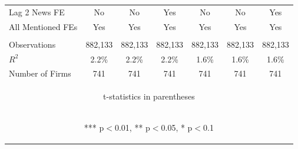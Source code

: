 \documentclass[border=0.2cm]{standalone}
\begin{document}
\begin{tabular}{lcccccc}
    Lag 2 News FE     & No                                             & No                                             & Yes                                            & No                                             & No                                             & Yes                                            \\
    All Mentioned FEs & Yes                                            & Yes                                            & Yes                                            & Yes                                            & Yes                                            & Yes                                            \\
    \vspace{4pt}      &                                                &                                                &                                                &                                                &                                                &                                                \\
    Observations      & 882,133                                        & 882,133                                        & 882,133                                        & 882,133                                        & 882,133                                        & 882,133                                        \\
    \(R^2\)           & 2.2\%                                          & 2.2\%                                          & 2.2\%                                          & 1.6\%                                          & 1.6\%                                          & 1.6\%                                          \\
    Number of Firms   & 741                                            & 741                                            & 741                                            & 741                                            & 741                                            & 741                                            \\
    \bottomrule
    \multicolumn{7}{c}{\begin{footnotesize} t-statistics in parentheses\end{footnotesize}}                                                                                                                                                                                                                                  \\
    \multicolumn{7}{c}{\begin{footnotesize} *** p$<$0.01, ** p$<$0.05, * p$<$0.1\end{footnotesize}}                                                                                                                                                                                                                         \\
\end{tabular}
\end{document}

